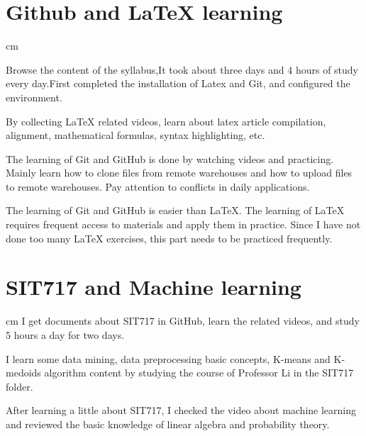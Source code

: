 \section{Github and LaTeX learning}\label{sec-intro}
 cm%

\setlength{\parindent}{2em}
Browse the content of the syllabus,It took about three days and 4 hours of study every day.First completed the installation of Latex and Git, and configured the environment.


By collecting LaTeX related videos, learn about latex article compilation, alignment, mathematical formulas, syntax highlighting, etc.

The learning of Git and GitHub is done by watching videos and practicing. Mainly learn how to clone files from remote warehouses and how to upload files to remote warehouses. Pay attention to conflicts in daily applications.

The learning of Git and GitHub is easier than LaTeX. The learning of LaTeX requires frequent access to materials and apply them in practice. Since I have not done too many LaTeX exercises, this part needs to be practiced frequently.


\section{SIT717 and Machine learning} \label{sec-preliminaries}
 cm%
\setlength{\parindent}{2em}
I get documents about SIT717 in GitHub, learn the related videos, and study 5 hours a day for two days.



I learn some data mining, data preprocessing basic concepts, K-means and K-medoids algorithm content by studying the course of Professor Li in the SIT717 folder.

After learning a little about SIT717, I checked the video about machine learning and reviewed the basic knowledge of linear algebra and probability theory. 

